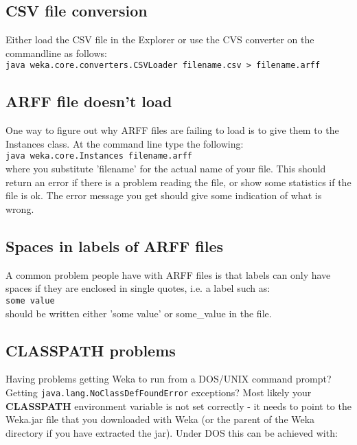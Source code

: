 \subsection{CSV file conversion}
Either load the CSV file in the Explorer or use the CVS converter on
the commandline as follows:\\

\verb=java weka.core.converters.CSVLoader filename.csv > filename.arff=\\

\subsection{ARFF file doesn't load}
One way to figure out why ARFF files are failing to load is to give
them to the Instances class. At the command line type the following:\\

\verb=java weka.core.Instances filename.arff=\\

\noindent where you substitute 'filename' for the actual name of your
file. This should return an error if there is a problem reading the
file, or show some statistics if the file is ok. The error message you
get should give some indication of what is wrong.

\subsection{Spaces in labels of ARFF files}
A common problem people have with ARFF files is that labels can only
have spaces if they are enclosed in single quotes, i.e. a label such
as:\\

\verb=some value=\\

\noindent should be written either 'some value' or some_value in the file.

\subsection{CLASSPATH problems}
Having problems getting Weka to run from a DOS/UNIX command prompt?
Getting \verb=java.lang.NoClassDefFoundError= exceptions? Most likely your
\textbf{CLASSPATH} environment variable is not set correctly - it needs to
point to the Weka.jar file that you downloaded with Weka (or the
parent of the Weka directory if you have extracted the jar). Under DOS
this can be achieved with:\\

